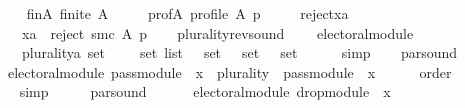 \begin{isabellebody}
\ \ \isamarkupfalse%
\isanewline
\ \ \ \ fin{\isacharunderscore}{\kern0pt}A{\isacharcolon}{\kern0pt}\ {\isachardoublequoteopen}finite\ A{\isachardoublequoteclose}\ \isanewline
\ \ \ \ prof{\isacharunderscore}{\kern0pt}A{\isacharcolon}{\kern0pt}\ {\isachardoublequoteopen}profile\ A\ p{\isachardoublequoteclose}\ \isanewline
\ \ \ \ reject{\isacharunderscore}{\kern0pt}xa{\isacharcolon}{\kern0pt}\isanewline
\ \ \ \ \ \ {\isachardoublequoteopen}xa\ {\isasymin}\ reject\ {\isacharparenleft}{\kern0pt}{\isacharquery}{\kern0pt}smc{\isacharparenright}{\kern0pt}\ A\ p{\isachardoublequoteclose}\isanewline
\ \ \isamarkupfalse%
\ plurality{\isacharunderscore}{\kern0pt}rev{\isacharunderscore}{\kern0pt}sound{\isacharcolon}{\kern0pt}\isanewline
\ \ \ \ {\isachardoublequoteopen}electoral{\isacharunderscore}{\kern0pt}module\isanewline
\ \ \ \ \ \ {\isacharparenleft}{\kern0pt}plurality{\isacharcolon}{\kern0pt}{\isacharcolon}{\kern0pt}{\isacharprime}{\kern0pt}a\ set\ {\isasymRightarrow}\ {\isacharparenleft}{\kern0pt}{\isacharunderscore}{\kern0pt}\ {\isasymtimes}\ {\isacharunderscore}{\kern0pt}{\isacharparenright}{\kern0pt}\ set\ list\ {\isasymRightarrow}\ {\isacharunderscore}{\kern0pt}\ set\ {\isasymtimes}\ {\isacharunderscore}{\kern0pt}\ set\ {\isasymtimes}\ {\isacharunderscore}{\kern0pt}\ set{\isasymdown}{\isacharparenright}{\kern0pt}{\isachardoublequoteclose}\isanewline
\ \ \ \ \isamarkupfalse%
\ simp\isanewline
\ \ \isamarkupfalse%
\ par{}{\isacharunderscore}{\kern0pt}sound{\isacharcolon}{\kern0pt}\isanewline
\ \ \ \ {\isachardoublequoteopen}electoral{\isacharunderscore}{\kern0pt}module\ {\isacharparenleft}{\kern0pt}pass{\isacharunderscore}{\kern0pt}module\ {}\ x\ {\isasymtriangleright}\ {\isacharparenleft}{\kern0pt}{\isacharparenleft}{\kern0pt}plurality{\isasymdown}{\isacharparenright}{\kern0pt}\ {\isasymtriangleright}\ pass{\isacharunderscore}{\kern0pt}module\ {}\ x{\isacharparenright}{\kern0pt}{\isacharparenright}{\kern0pt}{\isachardoublequoteclose}\isanewline
\ \ \ \ \isamarkupfalse%
\ order\isanewline
\ \ \ \ \isamarkupfalse%
\ simp\isanewline
\ \ \isamarkupfalse%
\ \isamarkupfalse%
\ par{}{\isacharunderscore}{\kern0pt}sound{\isacharcolon}{\kern0pt}\isanewline
\ \ \ \ \ \ {\isachardoublequoteopen}electoral{\isacharunderscore}{\kern0pt}module\ {\isacharparenleft}{\kern0pt}drop{\isacharunderscore}{\kern0pt}module\ {}\ x{\isacharparenright}{\kern0pt}{\isachardoublequoteclose}\isanewline

\end{isabellebody}
